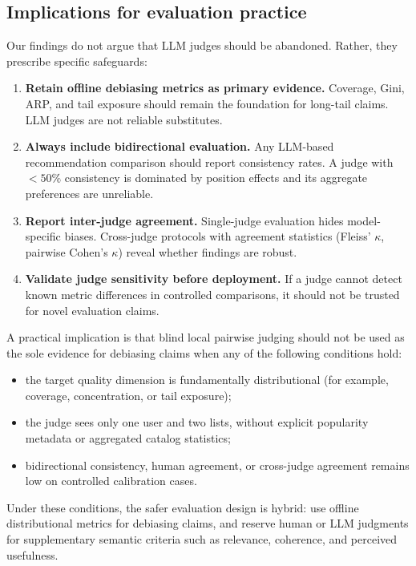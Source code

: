 \documentclass[pdflatex,sn-basic,referee,lineno]{sn-jnl}
\begin{document}
\subsection{Implications for evaluation practice}

Our findings do not argue that LLM judges should be abandoned. Rather, they prescribe specific safeguards:

\begin{enumerate}
\item \textbf{Retain offline debiasing metrics as primary evidence.} Coverage, Gini, ARP, and tail exposure should remain the foundation for long-tail claims. LLM judges are not reliable substitutes.
\item \textbf{Always include bidirectional evaluation.} Any LLM-based recommendation comparison should report consistency rates. A judge with $<50\%$ consistency is dominated by position effects and its aggregate preferences are unreliable.
\item \textbf{Report inter-judge agreement.} Single-judge evaluation hides model-specific biases. Cross-judge protocols with agreement statistics (Fleiss' $\kappa$, pairwise Cohen's $\kappa$) reveal whether findings are robust.
\item \textbf{Validate judge sensitivity before deployment.} If a judge cannot detect known metric differences in controlled comparisons, it should not be trusted for novel evaluation claims.
\end{enumerate}

A practical implication is that blind local pairwise judging should not be used as the sole evidence for debiasing claims when any of the following conditions hold:

\begin{itemize}
\item the target quality dimension is fundamentally distributional (for example, coverage, concentration, or tail exposure);
\item the judge sees only one user and two lists, without explicit popularity metadata or aggregated catalog statistics;
\item bidirectional consistency, human agreement, or cross-judge agreement remains low on controlled calibration cases.
\end{itemize}

Under these conditions, the safer evaluation design is hybrid: use offline distributional metrics for debiasing claims, and reserve human or LLM judgments for supplementary semantic criteria such as relevance, coherence, and perceived usefulness.
\end{document}
